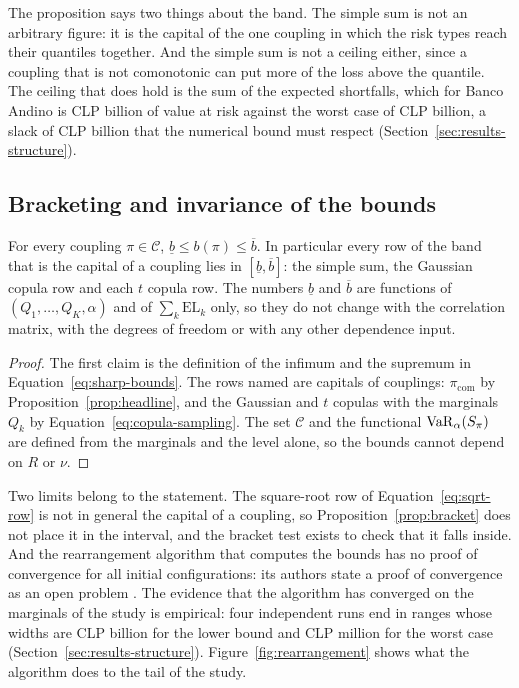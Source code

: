 The proposition says two things about the band. The simple sum is not an arbitrary figure: it is the capital of the one coupling
in which the risk types reach their quantiles together. And the simple sum is not a ceiling either, since a coupling that is not
comonotonic can put more of the loss above the quantile. The ceiling that does hold is the sum of the expected shortfalls, which
for Banco Andino is CLP \bdSumEs{} billion of value at risk against the worst case of CLP \bdWorstVar{} billion, a slack of
CLP \bdSlack{} billion that the numerical bound must respect (Section~\ref{sec:results-structure}).

\subsection{Bracketing and invariance of the bounds}
\label{sec:theory-bracket}

\begin{proposition}
\label{prop:bracket}
For every coupling $\pi\in\mathcal C$, $\underline b\le b(\pi)\le\overline b$. In particular every row of the band that is the
capital of a coupling lies in $[\underline b,\overline b]$: the simple sum, the Gaussian copula row and each $t$ copula row. The
numbers $\underline b$ and $\overline b$ are functions of $(Q_1,\dots,Q_K,\alpha)$ and of $\sum_k\mathrm{EL}_k$ only, so they do
not change with the correlation matrix, with the degrees of freedom or with any other dependence input.
\end{proposition}

\begin{proof}
The first claim is the definition of the infimum and the supremum in Equation~\ref{eq:sharp-bounds}. The rows named are capitals of
couplings: $\pi_{\mathrm{com}}$ by Proposition~\ref{prop:headline}, and the Gaussian and $t$ copulas with the marginals $Q_k$ by
Equation~\ref{eq:copula-sampling}. The set $\mathcal C$ and the functional $\operatorname{VaR}_\alpha(S_\pi)$ are defined from the marginals and
the level alone, so the bounds cannot depend on $R$ or $\nu$.
\end{proof}

Two limits belong to the statement. The square-root row of Equation~\ref{eq:sqrt-row} is not in general the capital of a coupling,
so Proposition~\ref{prop:bracket} does not place it in the interval, and the bracket test exists to check that it falls inside.
And the rearrangement algorithm that computes the bounds has no proof of convergence for all initial configurations: its authors
state a proof of convergence as an open problem \citep{puccetti2012,hofert2015}. The evidence that the algorithm has converged on
the marginals of the study is empirical: four independent runs end in ranges whose widths are
CLP \bdLowerRangeWidth{} billion for the lower bound and CLP \bdUpperRangeWidth{} million for the worst case
(Section~\ref{sec:results-structure}). Figure~\ref{fig:rearrangement} shows what the algorithm does to the tail of the study.

